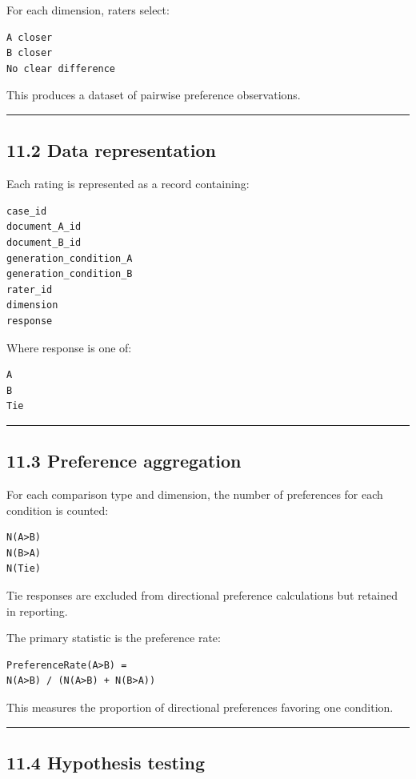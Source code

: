 {For each dimension, raters select:

\begin{verbatim}
A closer
B closer
No clear difference
\end{verbatim}

This produces a dataset of pairwise preference observations.

\noindent\rule{\textwidth}{0.4pt}

\subsection*{11.2 Data representation}

Each rating is represented as a record containing:

\begin{verbatim}
case_id
document_A_id
document_B_id
generation_condition_A
generation_condition_B
rater_id
dimension
response
\end{verbatim}

Where response is one of:

\begin{verbatim}
A
B
Tie
\end{verbatim}

\noindent\rule{\textwidth}{0.4pt}

\subsection*{11.3 Preference aggregation}

For each comparison type and dimension, the number of preferences for each condition is counted:

\begin{verbatim}
N(A>B)
N(B>A)
N(Tie)
\end{verbatim}

Tie responses are excluded from directional preference calculations but retained in reporting.

The primary statistic is the preference rate:

\begin{verbatim}
PreferenceRate(A>B) =
N(A>B) / (N(A>B) + N(B>A))
\end{verbatim}

This measures the proportion of directional preferences favoring one condition.

\noindent\rule{\textwidth}{0.4pt}

\subsection*{11.4 Hypothesis testing}

}
